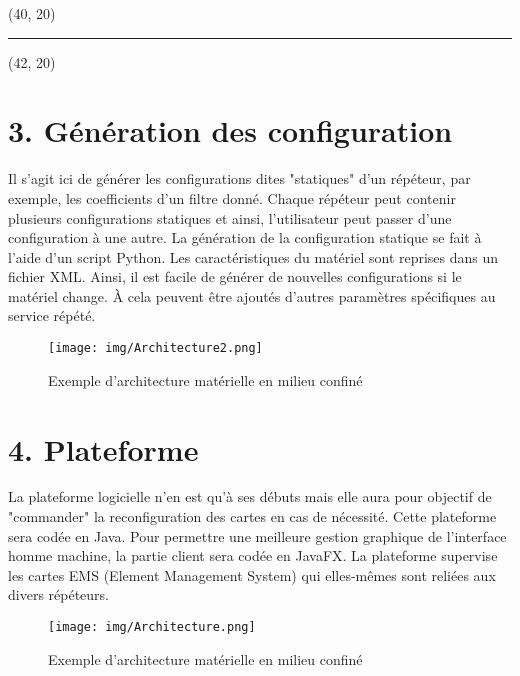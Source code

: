 \documentclass{beamer}
\begin{document}
\begin{textblock}{2}(40, 20)
	\begin{minipage}{0.99\textwidth}
	\begin{center}
	\rule{5pt}{84cm}	
	\end{center}
	\end{minipage}
\end{textblock}
\begin{textblock}{36}(42, 20)
	\begin{minipage}{0.99\textwidth}
	
	\section{3. Génération des configuration}
		Il s'agit ici de générer les configurations dites "statiques" d'un répéteur, par exemple, les coefficients d'un filtre donné. Chaque répéteur peut contenir plusieurs configurations statiques et ainsi, l'utilisateur peut passer d'une configuration à une autre.
		La génération de la configuration statique se fait à l'aide d'un script Python. Les caractéristiques du matériel sont reprises dans un fichier XML. Ainsi, il est facile de générer de nouvelles configurations si le matériel change. À cela peuvent être ajoutés d'autres paramètres spécifiques au service répété.
		\begin{figure}[!ht]
		\centering
		\texttt{[image: img/Architecture2.png]}
		\caption{Exemple d'architecture matérielle en milieu confiné}
		\end{figure}
	
	
	\section{4. Plateforme}
		La plateforme logicielle n'en est qu'à ses débuts mais elle aura pour objectif de "commander" la reconfiguration des cartes en cas de nécessité. Cette plateforme sera codée en Java. Pour permettre une meilleure gestion graphique de l'interface homme machine, la partie client sera codée en JavaFX. La plateforme supervise les cartes EMS (Element Management System) qui elles-mêmes sont reliées aux divers répéteurs.
		\begin{figure}[!ht]
		\centering
		\texttt{[image: img/Architecture.png]}
		\caption{Exemple d'architecture matérielle en milieu confiné}
		\end{figure}
	\end{minipage}
\end{textblock}
\end{document}
